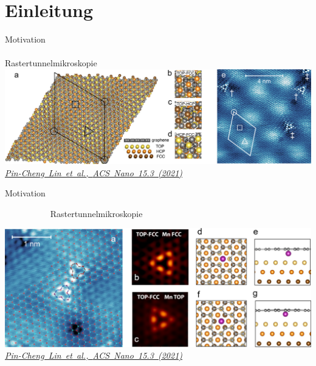 \documentclass[aspectratio=1610, 9pt, xcolor=dvipsnames]{beamer}
\begin{document}
\section{Einleitung}
\begin{frame}{Motivation}
     $\quad \quad \quad \quad \quad \quad \quad \quad \quad \quad \quad \quad \quad \quad \quad \quad \quad \quad \quad \quad \quad \quad \quad \quad \quad \quad
     \quad \quad \quad \quad \quad \quad \quad \quad \quad \quad \quad \quad$
     Rastertunnelmikroskopie
  \centering
  \includegraphics[width = \textwidth]{Plots/images_large_nn1c00139_0002.jpeg}
  \hspace*{12pt}\hbox{\scriptsize {\footnotesize\itshape \href{https://pubs.acs.org/doi/10.1021/acsnano.1c00139}{Pin-Cheng Lin et al., \textit{ACS Nano 15.3 (2021)}}}}
\end{frame}
  \begin{frame}{Motivation}
    \begin{flushleft}
      $\quad \quad \quad \quad \quad$ Rastertunnelmikroskopie
    \end{flushleft}
    \vspace*{-0.27cm}
    \centering
  \includegraphics[width = \textwidth]{Plots/images_large_nn1c00139_0003.jpeg}
  \hspace*{12pt}\hbox{\scriptsize {\footnotesize\itshape \href{https://pubs.acs.org/doi/10.1021/acsnano.1c00139}{Pin-Cheng Lin et al., \textit{ACS Nano 15.3 (2021)}}}}
\end{frame}
\end{document}
